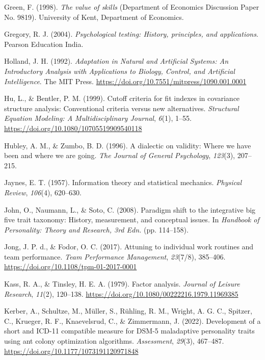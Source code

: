 \documentclass[
  12pt,
  a4paper,
  twoside]{article}
\newlength{\cslhangindent}
\newenvironment{CSLReferences}[2] %
 {\begin{list}{}{%
  \setlength{\itemindent}{0pt}
  \setlength{\leftmargin}{0pt}
  \setlength{\parsep}{0pt}
  \ifodd #1
   \setlength{\leftmargin}{\cslhangindent}
   \setlength{\itemindent}{-1\cslhangindent}
  \fi
  \setlength{\itemsep}{#2\baselineskip}}}
 {\end{list}}
\begin{document}
\begin{CSLReferences}{1}{0}
Green, F. (1998). \emph{The value of skills} (Department of Economics Discussion Paper No. 9819). University of Kent, Department of Economics.

Gregory, R. J. (2004). \emph{Psychological testing: History, principles, and applications}. Pearson Education India.

Holland, J. H. (1992). \emph{{Adaptation in Natural and Artificial Systems: An Introductory Analysis with Applications to Biology, Control, and Artificial Intelligence}}. The MIT Press. \url{https://doi.org/10.7551/mitpress/1090.001.0001}

Hu, L., \& Bentler, P. M. (1999). Cutoff criteria for fit indexes in covariance structure analysis: Conventional criteria versus new alternatives. \emph{Structural Equation Modeling: A Multidisciplinary Journal}, \emph{6}(1), 1--55. \url{https://doi.org/10.1080/10705519909540118}

Hubley, A. M., \& Zumbo, B. D. (1996). A dialectic on validity: Where we have been and where we are going. \emph{The Journal of General Psychology}, \emph{123}(3), 207--215.

Jaynes, E. T. (1957). Information theory and statistical mechanics. \emph{Physical Review}, \emph{106}(4), 620--630.

John, O., Naumann, L., \& Soto, C. (2008). Paradigm shift to the integrative big five trait taxonomy: History, measurement, and conceptual issues. In \emph{Handbook of Personality: Theory and Research, 3rd Edn.} (pp. 114--158).

Jong, J. P. d., \& Fodor, O. C. (2017). Attuning to individual work routines and team performance. \emph{Team Performance Management}, \emph{23}(7/8), 385--406. \url{https://doi.org/10.1108/tpm-01-2017-0001}

Kass, R. A., \& Tinsley, H. E. A. (1979). Factor analysis. \emph{Journal of Leisure Research}, \emph{11}(2), 120--138. \url{https://doi.org/10.1080/00222216.1979.11969385}

Kerber, A., Schultze, M., Müller, S., Rühling, R. M., Wright, A. G. C., Spitzer, C., Krueger, R. F., Knaevelsrud, C., \& Zimmermann, J. (2022). Development of a short and ICD-11 compatible measure for DSM-5 maladaptive personality traits using ant colony optimization algorithms. \emph{Assessment}, \emph{29}(3), 467--487. \url{https://doi.org/10.1177/1073191120971848}


\end{CSLReferences}
\end{document}
